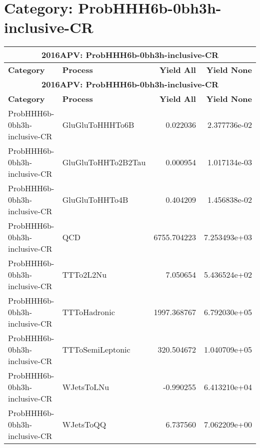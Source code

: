 \documentclass{article}
\begin{document}
\section*{Category: ProbHHH6b-0bh3h-inclusive-CR}
\begin{longtable}[c]{|l|l|r|r|}
\hline
\multicolumn{4}{|c|}{\textbf{2016APV: ProbHHH6b-0bh3h-inclusive-CR}} \\
\hline
\textbf{Category} & \textbf{Process} & \textbf{Yield All} & \textbf{Yield None} \\
\hline
\endfirsthead
\hline
\multicolumn{4}{|c|}{\textbf{2016APV: ProbHHH6b-0bh3h-inclusive-CR}} \\
\hline
\textbf{Category} & \textbf{Process} & \textbf{Yield All} & \textbf{Yield None} \\
\hline
\endhead
ProbHHH6b-0bh3h-inclusive-CR & GluGluToHHHTo6B & 0.022036 & 2.377736e-02 \\
\hline
ProbHHH6b-0bh3h-inclusive-CR & GluGluToHHTo2B2Tau & 0.000954 & 1.017134e-03 \\
\hline
ProbHHH6b-0bh3h-inclusive-CR & GluGluToHHTo4B & 0.404209 & 1.456838e-02 \\
\hline
ProbHHH6b-0bh3h-inclusive-CR & QCD & 6755.704223 & 7.253493e+03 \\
\hline
ProbHHH6b-0bh3h-inclusive-CR & TTTo2L2Nu & 7.050654 & 5.436524e+02 \\
\hline
ProbHHH6b-0bh3h-inclusive-CR & TTToHadronic & 1997.368767 & 6.792030e+05 \\
\hline
ProbHHH6b-0bh3h-inclusive-CR & TTToSemiLeptonic & 320.504672 & 1.040709e+05 \\
\hline
ProbHHH6b-0bh3h-inclusive-CR & WJetsToLNu & -0.990255 & 6.413210e+04 \\
\hline
ProbHHH6b-0bh3h-inclusive-CR & WJetsToQQ & 6.737560 & 7.062209e+00 \\
\hline
\end{longtable}
\end{document}
